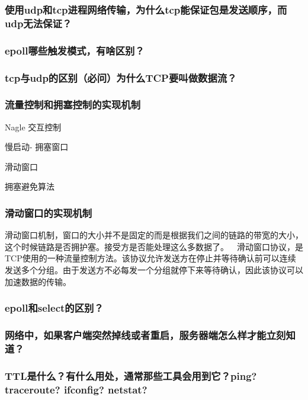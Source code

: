 \documentclass[UTF8,a4paper,8pt]{ctexart}
\begin{document}
		\subsubsection{使用udp和tcp进程网络传输，为什么tcp能保证包是发送顺序，而 udp无法保证？}
		
		\subsubsection{epoll哪些触发模式，有啥区别？}
		
		\subsubsection{tcp与udp的区别（必问）为什么TCP要叫做数据流？}
		
		\subsubsection{流量控制和拥塞控制的实现机制}
			Nagle 交互控制
		
			慢启动- 拥塞窗口
			
			滑动窗口
			
			拥塞避免算法
			
		\subsubsection{滑动窗口的实现机制}
			滑动窗口机制，窗口的大小并不是固定的而是根据我们之间的链路的带宽的大小，这个时候链路是否拥护塞。接受方是否能处理这么多数据了。  滑动窗口协议，是TCP使用的一种流量控制方法。该协议允许发送方在停止并等待确认前可以连续发送多个分组。由于发送方不必每发一个分组就停下来等待确认，因此该协议可以加速数据的传输。
		
		\subsubsection{epoll和select的区别？}
		
		\subsubsection{网络中，如果客户端突然掉线或者重启，服务器端怎么样才能立刻知道？}
		
		\subsubsection{TTL是什么？有什么用处，通常那些工具会用到它？ping? traceroute? ifconfig? netstat?}
		
\end{document}
